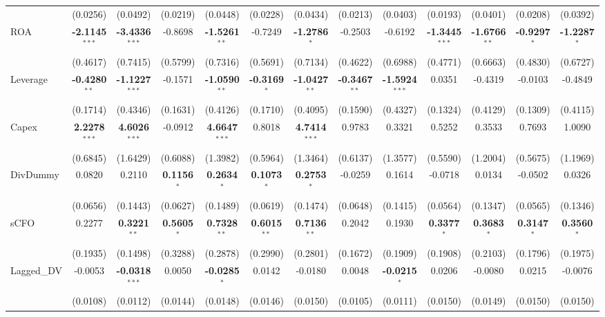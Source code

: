 \begin{landscape}
\begin{table}[H]
\begin{tabular}{lcccccccccccc}
 & (0.0256) & (0.0492) & (0.0219) & (0.0448) & (0.0228) & (0.0434) & (0.0213) & (0.0403) & (0.0193) & (0.0401) & (0.0208) & (0.0392) \\
ROA & \textbf{-2.1145}$^{***}$ & \textbf{-3.4336}$^{***}$ & -0.8698 & \textbf{-1.5261}$^{**}$ & -0.7249 & \textbf{-1.2786}$^{*}$ & -0.2503 & -0.6192 & \textbf{-1.3445}$^{***}$ & \textbf{-1.6766}$^{**}$ & \textbf{-0.9297}$^{*}$ & \textbf{-1.2287}$^{*}$ \\
 & (0.4617) & (0.7415) & (0.5799) & (0.7316) & (0.5691) & (0.7134) & (0.4622) & (0.6988) & (0.4771) & (0.6663) & (0.4830) & (0.6727) \\
Leverage & \textbf{-0.4280}$^{**}$ & \textbf{-1.1227}$^{***}$ & -0.1571 & \textbf{-1.0590}$^{**}$ & \textbf{-0.3169}$^{*}$ & \textbf{-1.0427}$^{**}$ & \textbf{-0.3467}$^{**}$ & \textbf{-1.5924}$^{***}$ & 0.0351 & -0.4319 & -0.0103 & -0.4849 \\
 & (0.1714) & (0.4346) & (0.1631) & (0.4126) & (0.1710) & (0.4095) & (0.1590) & (0.4327) & (0.1324) & (0.4129) & (0.1309) & (0.4115) \\
Capex & \textbf{2.2278}$^{***}$ & \textbf{4.6026}$^{***}$ & -0.0912 & \textbf{4.6647}$^{***}$ & 0.8018 & \textbf{4.7414}$^{***}$ & 0.9783 & 0.3321 & 0.5252 & 0.3533 & 0.7693 & 1.0090 \\
 & (0.6845) & (1.6429) & (0.6088) & (1.3982) & (0.5964) & (1.3464) & (0.6137) & (1.3577) & (0.5590) & (1.2004) & (0.5675) & (1.1969) \\
DivDummy & 0.0820 & 0.2110 & \textbf{0.1156}$^{*}$ & \textbf{0.2634}$^{*}$ & \textbf{0.1073}$^{*}$ & \textbf{0.2753}$^{*}$ & -0.0259 & 0.1614 & -0.0718 & 0.0134 & -0.0502 & 0.0326 \\
 & (0.0656) & (0.1443) & (0.0627) & (0.1489) & (0.0619) & (0.1474) & (0.0648) & (0.1415) & (0.0564) & (0.1347) & (0.0565) & (0.1346) \\
sCFO & 0.2277 & \textbf{0.3221}$^{**}$ & \textbf{0.5605}$^{*}$ & \textbf{0.7328}$^{**}$ & \textbf{0.6015}$^{**}$ & \textbf{0.7136}$^{**}$ & 0.2042 & 0.1930 & \textbf{0.3377}$^{*}$ & \textbf{0.3683}$^{*}$ & \textbf{0.3147}$^{*}$ & \textbf{0.3560}$^{*}$ \\
 & (0.1935) & (0.1498) & (0.3288) & (0.2878) & (0.2990) & (0.2801) & (0.1672) & (0.1909) & (0.1908) & (0.2103) & (0.1796) & (0.1975) \\
Lagged\_DV & -0.0053 & \textbf{-0.0318}$^{***}$ & 0.0050 & \textbf{-0.0285}$^{*}$ & 0.0142 & -0.0180 & 0.0048 & \textbf{-0.0215}$^{*}$ & 0.0206 & -0.0080 & 0.0215 & -0.0076 \\
 & (0.0108) & (0.0112) & (0.0144) & (0.0148) & (0.0146) & (0.0150) & (0.0105) & (0.0111) & (0.0150) & (0.0149) & (0.0150) & (0.0150) \\

\end{tabular}
\end{table}
\end{landscape}
